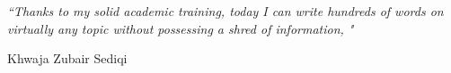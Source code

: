 \documentclass[11pt, a4paper, oneside]{Thesis} %
\begin{document}
\pagestyle{empty} %

\null\vfill %

\textit{``Thanks to my solid academic training, today I can write hundreds of words on virtually any topic without possessing a shred of information, "}

\begin{flushright}
Khwaja Zubair Sediqi
\end{flushright}

\vfill\vfill\vfill\vfill\vfill\vfill\null %

\clearpage %


\end{document}
